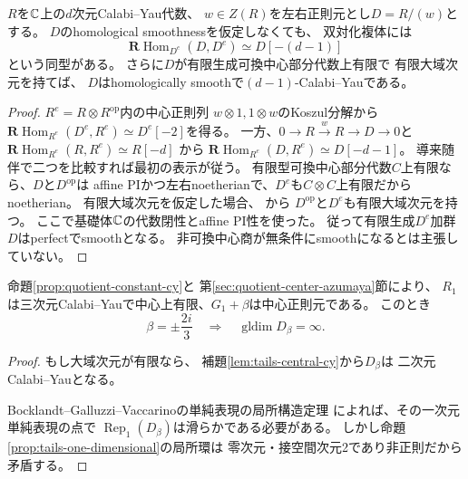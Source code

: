\begin{lemma}[有限中心を持つ中心正則商のCY双対性]
\label{lem:tails-central-cy}
$R$を$\mathbb C$上の$d$次元Calabi--Yau代数、
$w\in Z(R)$を左右正則元とし$D=R/(w)$とする。
$D$のhomological smoothnessを仮定しなくても、
双対化複体には
\[
 \mathbf R\operatorname{Hom}_{D^e}(D,D^e)
 \simeq D[-(d-1)]
\]
という同型がある。
さらに$D$が有限生成可換中心部分代数上有限で
有限大域次元を持てば、
$D$はhomologically smoothで$(d-1)$-Calabi--Yauである。
\end{lemma}
\begin{proof}
$R^e=R\otimes R^{\mathrm{op}}$内の中心正則列
$w\otimes1,1\otimes w$のKoszul分解から
$\mathbf R\operatorname{Hom}_{R^e}(D^e,R^e)
 \simeq D^e[-2]$を得る。
一方、$0\to R\xrightarrow{w}R\to D\to0$と
$\mathbf R\operatorname{Hom}_{R^e}(R,R^e)\simeq R[-d]$
から
$\mathbf R\operatorname{Hom}_{R^e}(D,R^e)\simeq D[-d-1]$。
導来随伴で二つを比較すれば最初の表示が従う。
有限型可換中心部分代数$C$上有限なら、$D$と$D^{\mathrm{op}}$は
affine PIかつ左右noetherianで、$D^e$も$C\otimes C$上有限だからnoetherian。
有限大域次元を仮定した場合、
\cite[Lemmas~3.4, 3.5]{RSVBertini}から
$D^{\mathrm{op}}$と$D^e$も有限大域次元を持つ。
ここで基礎体$\mathbb C$の代数閉性とaffine PI性を使った。
従って有限生成$D^e$加群$D$はperfectでsmoothとなる。
非可換中心商が無条件にsmoothになるとは主張していない。
\end{proof}

\begin{theorem}[二つの真に悪いaffine中心値]
\label{thm:tails-bad-affine}
命題\ref{prop:quotient-constant-cy}と
第\ref{sec:quotient-center-azumaya}節により、
$R_1$は三次元Calabi--Yauで中心上有限、$G_1+\beta$は中心正則元である。
このとき
\[
 \beta=\pm\frac{2i}{3}
 \quad\Longrightarrow\quad \operatorname{gldim}D_\beta=\infty.
\]
\end{theorem}
\begin{proof}
もし大域次元が有限なら、
補題\ref{lem:tails-central-cy}から$D_\beta$は
二次元Calabi--Yauとなる。

Bocklandt--Galluzzi--\allowbreak Vaccarinoの単純表現の局所構造定理
\cite[Theorems 6.3, 6.6 and Corollary 6.8]{BGV}
によれば、その一次元単純表現の点で
$\operatorname{Rep}_1(D_\beta)$は滑らかである必要がある。
しかし命題\ref{prop:tails-one-dimensional}の局所環は
零次元・接空間次元2であり非正則だから矛盾する。
\end{proof}

